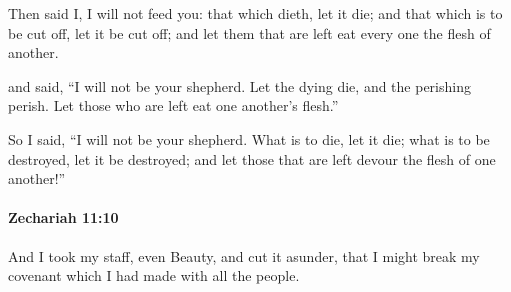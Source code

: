			\begin{versebox}
					\item[BHS] 
					\item[LXX] 
					\item[ASV] Then said I, I will not feed you: that which dieth, let it die; and that which is to be cut off, let it be cut off; and let them that are left eat every one the flesh of another.
					\item[NIV] and said, “I will not be your shepherd. Let the dying die, and the perishing perish. Let those who are left eat one another’s flesh.”
					\item[NRSV] So I said, “I will not be your shepherd. What is to die, let it die; what is to be destroyed, let it be destroyed; and let those that are left devour the flesh of one another!”
			\end{versebox}

		\paragraph{Zechariah 11:10} %
			\label{ZECHARIAH-11-10}

			And I took my staff, even Beauty, and cut it asunder, that I might break my covenant which I had made with all the people.

